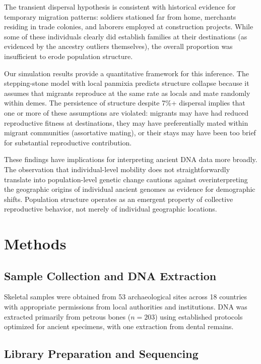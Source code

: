 \documentclass[11pt]{article}
\begin{document}
The transient dispersal hypothesis is consistent with historical evidence for temporary migration patterns: soldiers stationed far from home, merchants residing in trade colonies, and laborers employed at construction projects. While some of these individuals clearly did establish families at their destinations (as evidenced by the ancestry outliers themselves), the overall proportion was insufficient to erode population structure.

Our simulation results provide a quantitative framework for this inference. The stepping-stone model with local panmixia predicts structure collapse because it assumes that migrants reproduce at the same rate as locals and mate randomly within demes. The persistence of structure despite 7\%+ dispersal implies that one or more of these assumptions are violated: migrants may have had reduced reproductive fitness at destinations, they may have preferentially mated within migrant communities (assortative mating), or their stays may have been too brief for substantial reproductive contribution.

These findings have implications for interpreting ancient DNA data more broadly. The observation that individual-level mobility does not straightforwardly translate into population-level genetic change cautions against overinterpreting the geographic origins of individual ancient genomes as evidence for demographic shifts. Population structure operates as an emergent property of collective reproductive behavior, not merely of individual geographic locations.

\section{Methods}

\subsection{Sample Collection and DNA Extraction}

Skeletal samples were obtained from 53 archaeological sites across 18 countries with appropriate permissions from local authorities and institutions. DNA was extracted primarily from petrous bones ($n = 203$) using established protocols optimized for ancient specimens, with one extraction from dental remains.

\subsection{Library Preparation and Sequencing}
\end{document}
